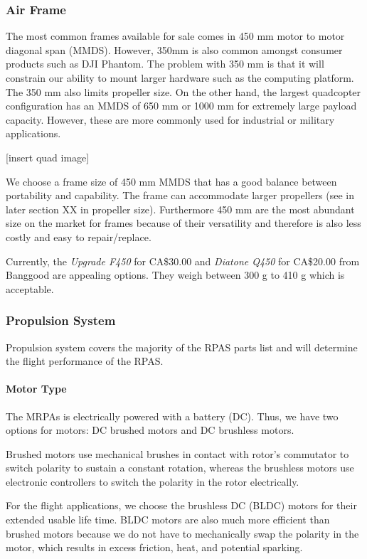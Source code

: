 \subsubsection{Air Frame}

The most common frames available for sale comes in 450 mm motor to motor diagonal span (MMDS). However, 
350mm is also common amongst consumer products such as DJI Phantom. The problem with 350 mm is that it will 
constrain our ability to mount larger hardware such as the computing platform. The 350 mm also limits 
propeller size. On the other hand, the largest quadcopter configuration has an MMDS of 650 mm or 1000 mm 
for extremely large payload capacity. However, these are more commonly used for industrial or military 
applications.

[insert quad image]

We choose a frame size of 450 mm MMDS that has a good balance between portability and capability. The frame 
can accommodate larger propellers (see in later section XX in propeller size). Furthermore 450 mm are the 
most abundant size on the market for frames because of their versatility and therefore is also less costly 
and easy to repair/replace.

Currently, the \textit{Upgrade F450} for CA\$30.00 and \textit{Diatone Q450} for CA\$20.00 from Banggood are appealing options. They weigh between 300 g to 410 g which is acceptable.

\subsubsection{Propulsion System}

Propulsion system covers the majority of the RPAS parts list and will determine the flight performance of the RPAS. 

\paragraph{Motor Type}

The MRPAs is electrically powered with a battery (DC). Thus, we have two options for motors: DC brushed 
motors and DC brushless motors.

Brushed motors use mechanical brushes in contact with rotor’s commutator to switch polarity to sustain a 
constant rotation, whereas the brushless motors use electronic controllers to switch the polarity in the 
rotor electrically. 

For the flight applications, we choose the brushless DC (BLDC) motors for their extended usable life time. 
BLDC motors are also much more efficient than brushed motors because we do not have to mechanically swap 
the polarity in the motor, which results in excess friction, heat, and potential sparking.

